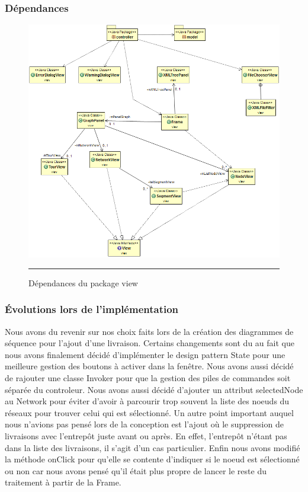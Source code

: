 \subsubsection{Dépendances}

\begin{figure}[H]
	\centering
		\includegraphics[width=\textwidth,height=\textheight,keepaspectratio]{Figures/retro_view_dep}
		\rule{35em}{0.5pt}
	\caption[Dépendances du package view]{Dépendances du package view}
\end{figure}
\subsubsection{Évolutions lors de l'implémentation}
Nous avons du revenir sur nos choix faits lors de la création des diagrammes de séquence pour l’ajout d’une livraison. Certains changements sont du au fait que nous avons finalement décidé d’implémenter le design pattern State pour une meilleure gestion des boutons à activer dans la fenêtre. Nous avons aussi décidé de rajouter une classe Invoker pour que la gestion des piles de commandes soit séparée du controleur. Nous avons aussi décidé d’ajouter un attribut selectedNode au Network pour éviter d’avoir à parcourir trop souvent la liste des noeuds du 
réseaux pour trouver celui qui est sélectionné. Un autre point important auquel nous n’avions pas pensé lors de la conception est l’ajout où le suppression de livraisons avec l’entrepôt juste avant ou après. En effet, l’entrepôt n’étant pas dans la liste des livraisons, il s’agit d’un cas particulier. Enfin nous avons modifié la méthode onClick pour qu’elle se contente d’indiquer si le noeud est sélectionné ou non car nous avons pensé qu’il était plus propre de lancer le reste du traitement à partir de la Frame.

